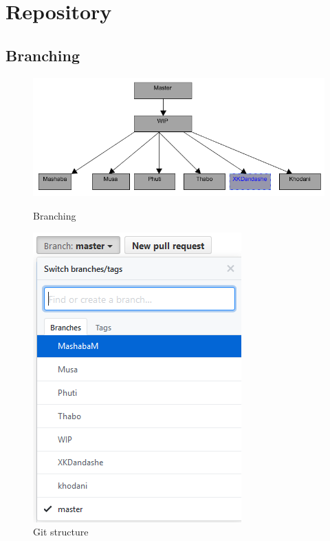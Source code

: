 \documentclass[english]{article}
\begin{document}
\section{Repository}

\subsection{Branching}		

\begin{figure}[!htb]
  \includegraphics[width=\linewidth]{images/Branching.png}
  \caption{Branching}\label{Branching}
\endminipage\hfill
{}
  \includegraphics[width=\linewidth]{images/GitStructure.png}
  \caption{Git structure}\label{Git structure}
\endminipage\hfill
\end{figure}
\end{document}
